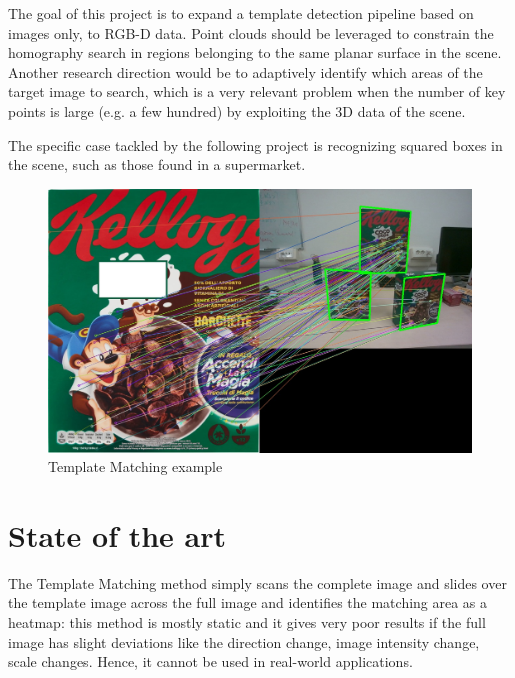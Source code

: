 \documentclass{article}
\begin{document}
The goal of this project is to expand a template detection pipeline based on images only, to RGB-D data. Point clouds should be leveraged to constrain the homography search in regions belonging to the same planar surface in the scene.\\
Another research direction would be to adaptively identify which areas of the target image to search, which is a very relevant problem when the number of key points is large (e.g. a few hundred) by exploiting the 3D data of the scene.

The specific case tackled by the following project is recognizing squared boxes in the scene, such as those found in a supermarket.

\begin{figure}[H]
    \centering
     \includegraphics[width=\textwidth]{image/matching_example.jpg}
    \caption{Template Matching example}
\end{figure}

\section{State of the art} %
The Template Matching method simply scans the complete image and slides over the template image across the full image and identifies the matching area as a heatmap: this method is mostly static and it gives very poor results if the full image has slight deviations like the direction change, image intensity change, scale changes. Hence, it cannot be used in real-world applications. \\
\end{document}
